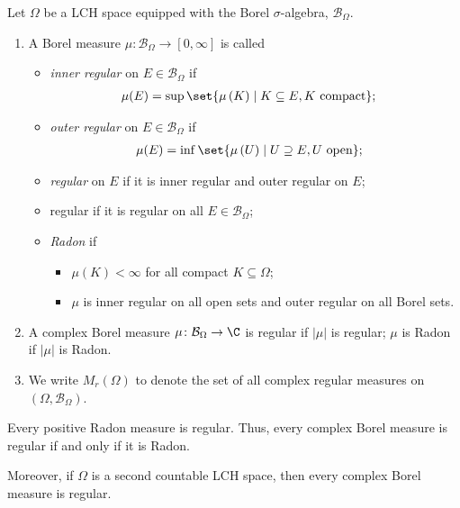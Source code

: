\begin{definition}
  Let $\Omega$ be a LCH space equipped with the Borel $\sigma$-algebra, $\mathcal{B}_{\Omega}$.
  \begin{enumerate}[(1)]
    \item A Borel measure $\mu\colon \mathcal{B}_{\Omega}\rightarrow [0,\infty]$ is called
      \begin{itemize}
        \item \textit{inner regular} on $E\in \mathcal{B}_{\Omega}$ if
          \begin{align*}
            \mu(E) &= \sup\set{\mu\left(K\right)\mid K\subseteq E, K\text{ compact}};
          \end{align*}
        \item \textit{outer regular} on $E\in \mathcal{B}_{\Omega}$ if
          \begin{align*}
            \mu(E) &= \inf\set{\mu\left(U\right)\mid U\supseteq E,U\text{ open}};
          \end{align*}
        \item \textit{regular} on $E$ if it is inner regular and outer regular on $E$;
        \item regular if it is regular on all $E\in \mathcal{B}_{\Omega}$;
        \item \textit{Radon} if
          \begin{itemize}
            \item $\mu(K) < \infty$ for all compact $K\subseteq \Omega$;
            \item $\mu$ is inner regular on all open sets and outer regular on all Borel sets.
          \end{itemize}
      \end{itemize}
    \item A complex Borel measure $\mu\colon \mathcal{B}_{\Omega}\rightarrow \C$ is regular if $\left\vert \mu \right\vert$ is regular; $\mu$ is Radon if $\left\vert \mu \right\vert$ is Radon.
    \item We write $M_{r}\left(\Omega\right)$ to denote the set of all complex regular measures on $\left(\Omega,\mathcal{B}_{\Omega}\right)$.
  \end{enumerate}
\end{definition}
\begin{fact}
  Every positive Radon measure is regular. Thus, every complex Borel measure is regular if and only if it is Radon.\newline

  Moreover, if $\Omega$ is a second countable LCH space, then every complex Borel measure is regular.
\end{fact}

